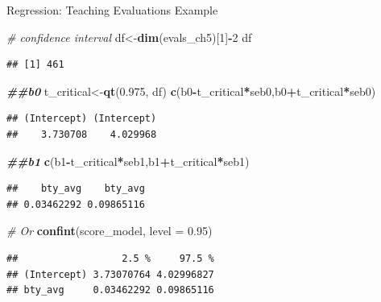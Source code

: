 \documentclass[
  ignorenonframetext,
]{beamer}
\newenvironment{Shaded}{\begin{snugshade}}{\end{snugshade}}
\newcommand{\AttributeTok}[1]{\textcolor[rgb]{0.13,0.29,0.53}{#1}}
\newcommand{\CommentTok}[1]{\textcolor[rgb]{0.56,0.35,0.01}{\textit{#1}}}
\newcommand{\DecValTok}[1]{\textcolor[rgb]{0.00,0.00,0.81}{#1}}
\newcommand{\DocumentationTok}[1]{\textcolor[rgb]{0.56,0.35,0.01}{\textbf{\textit{#1}}}}
\newcommand{\FloatTok}[1]{\textcolor[rgb]{0.00,0.00,0.81}{#1}}
\newcommand{\FunctionTok}[1]{\textcolor[rgb]{0.13,0.29,0.53}{\textbf{#1}}}
\newcommand{\NormalTok}[1]{#1}
\newcommand{\OtherTok}[1]{\textcolor[rgb]{0.56,0.35,0.01}{#1}}
\newcommand{\SpecialCharTok}[1]{\textcolor[rgb]{0.81,0.36,0.00}{\textbf{#1}}}
\begin{document}
\begin{frame}[fragile]{Regression: Teaching Evaluations Example}
\protect\hypertarget{regression-teaching-evaluations-example-8}{}
\tiny

\begin{Shaded}
\begin{Highlighting}[]
\CommentTok{\# confidence interval}
\NormalTok{df}\OtherTok{\textless{}{-}}\FunctionTok{dim}\NormalTok{(evals\_ch5)[}\DecValTok{1}\NormalTok{]}\SpecialCharTok{{-}}\DecValTok{2}
\NormalTok{df}
\end{Highlighting}
\end{Shaded}

\begin{verbatim}
## [1] 461
\end{verbatim}

\begin{Shaded}
\begin{Highlighting}[]
\DocumentationTok{\#\#b0}
\NormalTok{t\_critical}\OtherTok{\textless{}{-}}\FunctionTok{qt}\NormalTok{(}\FloatTok{0.975}\NormalTok{, df)}
\FunctionTok{c}\NormalTok{(b0}\SpecialCharTok{{-}}\NormalTok{t\_critical}\SpecialCharTok{*}\NormalTok{seb0,b0}\SpecialCharTok{+}\NormalTok{t\_critical}\SpecialCharTok{*}\NormalTok{seb0)}
\end{Highlighting}
\end{Shaded}

\begin{verbatim}
## (Intercept) (Intercept) 
##    3.730708    4.029968
\end{verbatim}

\begin{Shaded}
\begin{Highlighting}[]
\DocumentationTok{\#\#b1}
\FunctionTok{c}\NormalTok{(b1}\SpecialCharTok{{-}}\NormalTok{t\_critical}\SpecialCharTok{*}\NormalTok{seb1,b1}\SpecialCharTok{+}\NormalTok{t\_critical}\SpecialCharTok{*}\NormalTok{seb1)}
\end{Highlighting}
\end{Shaded}

\begin{verbatim}
##    bty_avg    bty_avg 
## 0.03462292 0.09865116
\end{verbatim}

\begin{Shaded}
\begin{Highlighting}[]
\CommentTok{\# Or}
\FunctionTok{confint}\NormalTok{(score\_model, }\AttributeTok{level =} \FloatTok{0.95}\NormalTok{)}
\end{Highlighting}
\end{Shaded}

\begin{verbatim}
##                  2.5 %     97.5 %
## (Intercept) 3.73070764 4.02996827
## bty_avg     0.03462292 0.09865116
\end{verbatim}

\normalsize
\end{frame}
\end{document}
